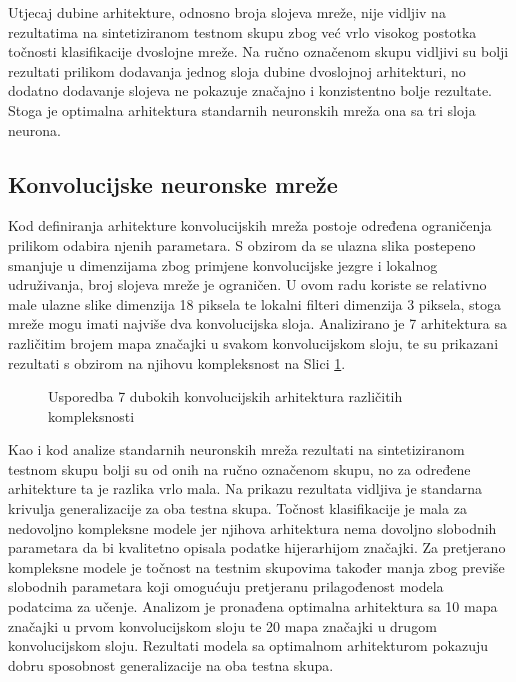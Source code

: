 \documentclass[lmodern, utf8, diplomski, numeric]{fer}
\begin{document}
Utjecaj dubine arhitekture, odnosno broja slojeva mreže, nije vidljiv na rezultatima na sintetiziranom testnom skupu zbog već vrlo visokog postotka točnosti klasifikacije dvoslojne mreže. Na ručno označenom skupu vidljivi su bolji rezultati prilikom dodavanja jednog sloja dubine dvoslojnoj arhitekturi, no dodatno dodavanje slojeva ne pokazuje značajno i konzistentno bolje rezultate. Stoga je optimalna arhitektura standarnih neuronskih mreža ona sa tri sloja neurona.

\subsection{Konvolucijske neuronske mreže}

Kod definiranja arhitekture konvolucijskih mreža postoje određena ograničenja prilikom odabira njenih parametara. S obzirom da se ulazna slika postepeno smanjuje u dimenzijama zbog primjene konvolucijske jezgre i lokalnog udruživanja, broj slojeva mreže je ograničen. U ovom radu koriste se relativno male ulazne slike dimenzija 18 piksela te lokalni filteri dimenzija 3 piksela, stoga mreže mogu imati najviše dva konvolucijska sloja. Analizirano je 7 arhitektura sa različitim brojem mapa značajki u svakom konvolucijskom sloju, te su prikazani rezultati s obzirom na njihovu kompleksnost na Slici \ref{graf:cnncomplex}.

\begin{figure}[ht!]
\begin{center}
    
    \caption{Usporedba 7 dubokih konvolucijskih arhitektura različitih kompleksnosti}
    \label{graf:cnncomplex}
\end{center}
\end{figure}

Kao i kod analize standarnih neuronskih mreža rezultati na sintetiziranom testnom skupu bolji su od onih na ručno označenom skupu, no za određene arhitekture ta je razlika vrlo mala. Na prikazu rezultata vidljiva je standarna krivulja generalizacije za oba testna skupa. Točnost klasifikacije je mala za nedovoljno kompleksne modele jer njihova arhitektura nema dovoljno slobodnih parametara da bi kvalitetno opisala podatke hijerarhijom značajki. Za pretjerano kompleksne modele je točnost na testnim skupovima također manja zbog previše slobodnih parametara koji omogućuju pretjeranu prilagođenost modela podatcima za učenje. Analizom je pronađena optimalna arhitektura sa 10 mapa značajki u prvom konvolucijskom sloju te 20 mapa značajki u drugom konvolucijskom sloju. Rezultati modela sa optimalnom arhitekturom pokazuju dobru sposobnost generalizacije na oba testna skupa.
\end{document}
